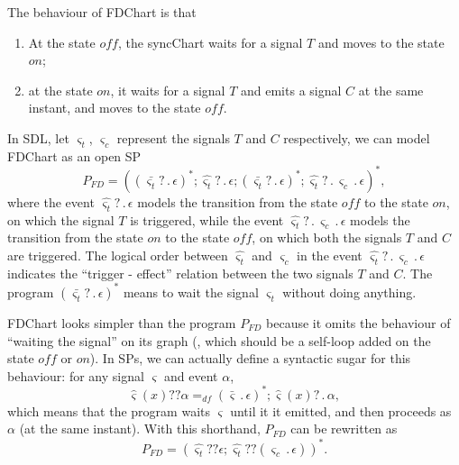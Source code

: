 \documentclass{fcs}
\newcommand{\sig}[0]{\varsigma}
\DeclareMathOperator{\seq}{;}
\DeclareMathOperator{\nex}{.}
\newcommand{\dddef}[0]{=_{df}}
\begin{document}
The behaviour of FDChart is that
\begin{enumerate}[(1)]
    \item At the state $\mathit{off}$, the syncChart waits for a signal $T$ and moves to the state $\mathit{on}$;
    \item at the state $\mathit{on}$, it waits for a signal $T$ and emits a signal $C$ at the same instant, and moves to the state $\mathit{off}$.
\end{enumerate}
In SDL, let $\sig_t$, $\sig_c$ represent the signals $T$ and $C$ respectively, we can model FDChart as an open SP
$$
P_{\mathit{FD}} = ((\bar{\sig_t}?\nex \epsilon)^*\seq \hat{\sig_t}?\nex \epsilon\seq (\bar{\sig_t}?\nex \epsilon)^*\seq \hat{\sig_t}?\nex \sig_c\nex \epsilon)^*,
$$
where the event $\hat{\sig_t}?\nex \epsilon$ models the transition from the  state $\mathit{off}$ to the  state $\mathit{on}$, on which the signal $T$ is triggered,
while the event $\hat{\sig_t}?\nex \sig_c\nex \epsilon$ models the transition from the state $\mathit{on}$ to the state $\mathit{off}$, on which both the signals $T$ and $C$ are triggered.
The logical order between $\hat{\sig_t}$ and $\sig_c$ in the event $\hat{\sig_t}?\nex \sig_c\nex \epsilon$ indicates the ``trigger - effect'' relation between the two signals $T$ and $C$.
The program $(\bar{\sig_t}?\nex \epsilon)^*$ means to wait the signal $\sig_t$ without doing anything.

FDChart looks simpler than the program $P_{\mathit{FD}}$ because it omits the behaviour of ``waiting the signal'' on its graph (, which should be a self-loop added on the state $\mathit{off}$ or $\mathit{on}$).
In SPs, we can actually define a syntactic sugar for this behaviour: for any signal $\sig$ and event $\alpha$,
\begin{equation}
\label{equ:sugar}
\hat{\sig}(x)?? \alpha \dddef (\bar{\sig}\nex \epsilon)^*\seq \hat{\sig}(x)?\nex \alpha,
\end{equation}
which means that the program waits $\sig$ until it it emitted, and then proceeds as $\alpha$ (at the same instant).
With this shorthand, $P_{\mathit{FD}}$ can be rewritten as
$$
P_{\mathit{FD}} = (\hat{\sig_t}?? \epsilon \seq \hat{\sig_t}?? (\sig_c\nex \epsilon))^*.
$$
\end{document}
